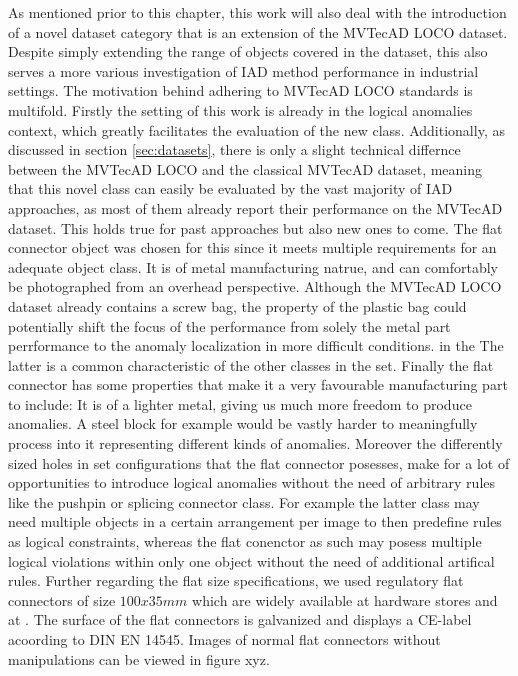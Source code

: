 As mentioned prior to this chapter, this work will also deal with the introduction of a novel dataset category that is an extension of the MVTecAD LOCO \cite{LOCODentsAndScratchesBergmann2022} dataset. 
Despite simply extending the range of objects covered in the dataset, this also serves a more various investigation of IAD method performance in industrial settings. The motivation behind adhering 
to MVTecAD LOCO standards is multifold. Firstly the setting of this work is already in the logical anomalies context, which greatly facilitates the evaluation of the new class. Additionally, as 
discussed in section \ref{sec:datasets}, there is only a slight technical differnce between the MVTecAD LOCO and the classical MVTecAD \cite{MVTEC_Bergmann_2021} dataset, meaning that this novel 
class can easily be evaluated by the vast majority of IAD approaches, as most of them already report their performance on the MVTecAD dataset. This holds true for past approaches but also new ones 
to come.
\newline\newline
The flat connector object was chosen for this since it meets multiple requirements for an adequate object class. It is of metal manufacturing natrue, and can comfortably be photographed from 
an overhead perspective. Although the MVTecAD LOCO dataset already contains a screw bag, the property of the plastic bag could potentially shift the focus of the performance from solely the metal 
part perrformance to the anomaly localization in more difficult conditions. in the The latter is a common characteristic of the other classes in the set. Finally the flat connector has some 
properties that make it a very favourable manufacturing part to include: It is of a lighter metal, giving us much more freedom to produce anomalies. A steel block for example would be vastly 
harder to meaningfully process into it representing different kinds of anomalies. Moreover the differently sized holes in set configurations that the flat connector posesses, make for a lot of opportunities 
to introduce logical anomalies without the need of arbitrary rules like the pushpin or splicing connector class. For example the latter class may need multiple objects in a certain arrangement per image to then predefine 
rules as logical constraints, whereas the flat conenctor as such may posess multiple logical violations within only one object without the need of additional artifical rules.
\newline
Further regarding the flat size specifications, we used regulatory flat 
connectors of size $100x35 mm$ which are widely available at hardware stores and at \cite{flatconnectorlink}. The surface of the flat connectors is galvanized 
and displays a CE-label acoording to DIN EN 14545. Images of normal flat connectors without manipulations can be viewed in figure xyz.




